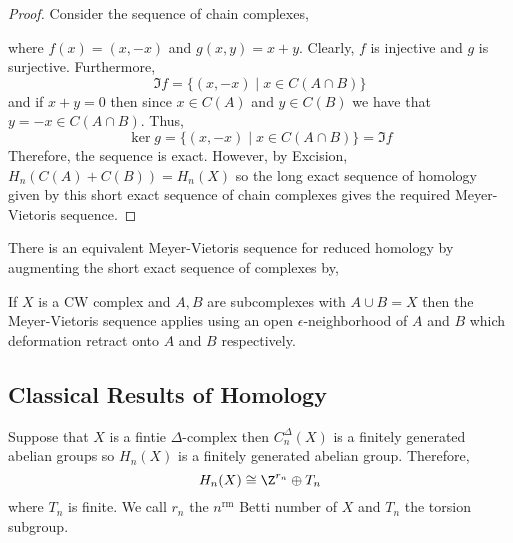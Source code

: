 \documentclass[12pt]{extarticle}
\begin{document}
\begin{proof}
Consider the sequence of chain complexes,
\begin{center}
\end{center}
where $f(x) = (x, -x)$ and $g(x,y) = x + y$. Clearly, $f$ is injective and $g$ is surjective. Furthermore, 
\[\Im{f} = \{ (x, -x) \mid x \in C(A \cap B) \}\]
and if $x + y = 0$ then since $x \in C(A)$ and $y \in C(B)$ we have that $y = -x \in C(A \cap B)$. Thus, 
\[\ker{g} = \{ (x, -x) \mid x \in C(A \cap B) \} = \Im{f}\]
Therefore, the sequence is exact.
However, by Excision, $H_n(C(A) + C(B)) = H_n(X)$ so the long exact sequence of homology given by this short exact sequence of chain complexes gives the required Meyer-Vietoris sequence.
\end{proof}

\begin{remark}
There is an equivalent Meyer-Vietoris sequence for reduced homology by augmenting the short exact sequence of complexes by,
\begin{center}
\end{center}
\end{remark}

\begin{remark}
If $X$ is a CW complex and $A, B$ are subcomplexes with $A \cup B = X$ then the Meyer-Vietoris sequence applies using an open $\epsilon$-neighborhood of $A$ and $B$ which deformation retract onto $A$ and $B$ respectively. 
\end{remark}

\subsection{Classical Results of Homology}

\begin{definition}
Suppose that $X$ is a fintie $\Delta$-complex then $C^\Delta_n(X)$ is a finitely generated abelian groups so $H_n(X)$ is a finitely generated abelian group. Therefore,
\[ H_n(X) \cong \Z^{r_n} \oplus T_n\] where $T_n$ is finite. We call $r_n$ the $n^{\mathrm{rm}}$ Betti number of $X$ and $T_n$ the torsion subgroup. 
\end{definition}
\end{document}
